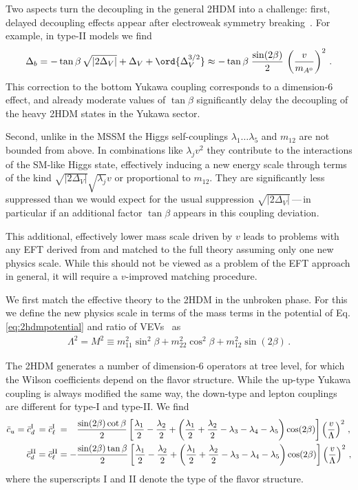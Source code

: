 Two aspects turn the decoupling in the general 2HDM into a challenge:
first, delayed decoupling effects appear after electroweak symmetry
breaking~\cite{Haber:2000kq}.  For example, in type-II models we
find~\cite{Lopez-Val:2013yba}
%
\begin{align} \Delta_b = - \tan \beta \, \sqrt{|2 \Delta_V|} +
\Delta_V + \ord{\Delta_V^{3/2}} \approx - \tan \beta \;
\frac{\sin (2\beta)}{2} \, \left( \dfrac{v}{m_{A^0}} \right)^2 \,.
\label{eq:2hdm_delayed}
\end{align}
%
This correction to the bottom Yukawa coupling corresponds to a
dimension-6 effect, and already moderate values of $\tan \beta$
significantly delay the decoupling of the heavy 2HDM states in the
Yukawa sector.

Second, unlike in the MSSM the Higgs self-couplings $\lambda_1 \dots
\lambda_5$ and $m_{12}$ are not bounded from above. In combinations
like $\lambda_j v^2$ they contribute to the interactions of the
SM-like Higgs state, effectively inducing a new energy scale through
terms of the kind $\sqrt{|2\Delta_V|} \sqrt{\lambda_j} v$ or
proportional to $m_{12}$. They are significantly less suppressed than
we would expect for the usual suppression
$\sqrt{|2\Delta_V|}$\,---\,in particular if an additional factor $\tan
\beta$ appears in this coupling deviation.

This additional, effectively lower mass scale driven by $v$ leads to
problems with any EFT derived from and matched to the full theory
assuming only one new physics scale. While this should not be viewed
as a problem of the EFT approach in general, it will require a
$v$-improved matching procedure.  \medskip

We first match the effective theory to the 2HDM in the unbroken
phase. For this we define the new physics scale in terms of the mass
terms in the potential of Eq.\,\eqref{eq:2hdmpotential} and ratio of
VEVs~\cite{heft_limitations2} as
%
\begin{align} \Lambda^2 = M^2 \equiv m^2_{11}\sin^2\beta +
m^2_{22}\cos^2\beta + m^2_{12} \sin (2\beta) \,.
\end{align}

The 2HDM generates a number of dimension-6 operators at tree level,
for which the Wilson coefficients depend on the flavor
structure. While the up-type Yukawa coupling is always modified the
same way, the down-type and lepton couplings are different for type-I
and type-II. We find
%
\begin{align} \bar{c}_u = \bar{c}_d^\text{I\phantom{I}} =
\bar{c}_\ell^\text{I\phantom{I}} &= \phantom{-} \dfrac{\sin (2\beta)
\cot\beta}{2} \left[\frac{\lambda_1}{2} -\frac{\lambda_2}{2}
+\left(\frac{\lambda_1}{2} +\frac{\lambda_2}{2}
-\lambda_3-\lambda_4-\lambda_5\right)\cos (2\beta) \right]
\left(\dfrac {v}{\Lambda} \right)^2 \,, \notag \\ \bar{c}_d^\text{II}
= \bar{c}_\ell^\text{II} &= - \dfrac{\sin (2\beta) \tan \beta}{2}
\left[\frac {\lambda_1} 2-\frac {\lambda_2} 2+\left(\frac {\lambda_1}
2 +\frac {\lambda_2} 2-\lambda_3-\lambda_4-\lambda_5\right)\cos
(2\beta) \right] \left(\dfrac{v}{\Lambda} \right)^2
\,, \label{eq:2hdmmatching1}
\end{align}
%
where the superscripts I and II denote the type of the flavor
structure.

